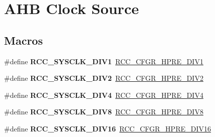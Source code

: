 \hypertarget{group___r_c_c___a_h_b___clock___source}{}\section{A\+HB Clock Source}
\label{group___r_c_c___a_h_b___clock___source}
\subsection*{Macros}
\begin{DoxyCompactItemize}
\item 
\#define {\bfseries R\+C\+C\+\_\+\+S\+Y\+S\+C\+L\+K\+\_\+\+D\+I\+V1}~\hyperlink{group___peripheral___registers___bits___definition_ga2b7d7f29b09a49c31404fc0d44645c84}{R\+C\+C\+\_\+\+C\+F\+G\+R\+\_\+\+H\+P\+R\+E\+\_\+\+D\+I\+V1}\hypertarget{group___r_c_c___a_h_b___clock___source_ga226f5bf675015ea677868132b6b83494}{}\label{group___r_c_c___a_h_b___clock___source_ga226f5bf675015ea677868132b6b83494}

\item 
\#define {\bfseries R\+C\+C\+\_\+\+S\+Y\+S\+C\+L\+K\+\_\+\+D\+I\+V2}~\hyperlink{group___peripheral___registers___bits___definition_gaa9eeb5e38e53e79b08a4ac438497ebea}{R\+C\+C\+\_\+\+C\+F\+G\+R\+\_\+\+H\+P\+R\+E\+\_\+\+D\+I\+V2}\hypertarget{group___r_c_c___a_h_b___clock___source_gac37c0610458a92e3cb32ec81014625c3}{}\label{group___r_c_c___a_h_b___clock___source_gac37c0610458a92e3cb32ec81014625c3}

\item 
\#define {\bfseries R\+C\+C\+\_\+\+S\+Y\+S\+C\+L\+K\+\_\+\+D\+I\+V4}~\hyperlink{group___peripheral___registers___bits___definition_gaffe860867ae4b1b6d28473ded1546d91}{R\+C\+C\+\_\+\+C\+F\+G\+R\+\_\+\+H\+P\+R\+E\+\_\+\+D\+I\+V4}\hypertarget{group___r_c_c___a_h_b___clock___source_ga6fd3652d6853563cdf388a4386b9d22f}{}\label{group___r_c_c___a_h_b___clock___source_ga6fd3652d6853563cdf388a4386b9d22f}

\item 
\#define {\bfseries R\+C\+C\+\_\+\+S\+Y\+S\+C\+L\+K\+\_\+\+D\+I\+V8}~\hyperlink{group___peripheral___registers___bits___definition_gaca71d6b42bdb83b5ff5320578869a058}{R\+C\+C\+\_\+\+C\+F\+G\+R\+\_\+\+H\+P\+R\+E\+\_\+\+D\+I\+V8}\hypertarget{group___r_c_c___a_h_b___clock___source_ga7def31373854ba9c72bb76b1d13e3aad}{}\label{group___r_c_c___a_h_b___clock___source_ga7def31373854ba9c72bb76b1d13e3aad}

\item 
\#define {\bfseries R\+C\+C\+\_\+\+S\+Y\+S\+C\+L\+K\+\_\+\+D\+I\+V16}~\hyperlink{group___peripheral___registers___bits___definition_ga3806da4f1afc9e5be0fca001c8c57815}{R\+C\+C\+\_\+\+C\+F\+G\+R\+\_\+\+H\+P\+R\+E\+\_\+\+D\+I\+V16}\hypertarget{group___r_c_c___a_h_b___clock___source_ga895462b261e03eade3d0139cc1327a51}{}\label{group___r_c_c___a_h_b___clock___source_ga895462b261e03eade3d0139cc1327a51}


\end{DoxyCompactItemize}
